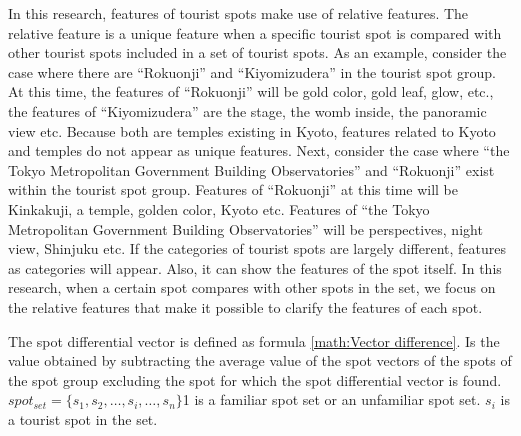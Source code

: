 \documentclass[journal]{IAENGtran}
\begin{document}
In this research, features of tourist spots make use of relative features.
The relative feature is a unique feature when a specific tourist spot is compared with other tourist spots included in a set of tourist spots.
As an example, consider the case where there are ``Rokuonji'' and ``Kiyomizudera'' in the tourist spot group.
At this time, the features of ``Rokuonji'' will be gold color, gold leaf, glow, etc., the features of ``Kiyomizudera'' are the stage, the womb inside, the panoramic view etc.
Because both are temples existing in Kyoto, features related to Kyoto and temples do not appear as unique features.
Next, consider the case where ``the Tokyo Metropolitan Government Building Observatories'' and ``Rokuonji'' exist within the tourist spot group.
Features of ``Rokuonji'' at this time will be Kinkakuji, a temple, golden color, Kyoto etc.
Features of ``the Tokyo Metropolitan Government Building Observatories'' will be perspectives, night view, Shinjuku etc.
If the categories of tourist spots are largely different, features as categories will appear.
Also, it can show the features of the spot itself.
In this research, when a certain spot compares with other spots in the set, we focus on the relative features that make it possible to clarify the features of each spot.

The spot differential vector is defined as formula \ref{math:Vector difference}.
Is the value obtained by subtracting the average value of the spot vectors of the spots of the spot group excluding the spot for which the spot differential vector is found.
$spot_{set} =\{s_1,s_2,\dots,s_i,\dots,s_n\}$1 is a familiar spot set or an unfamiliar spot set.
$s_i$ is a tourist spot in the set.
\end{document}
